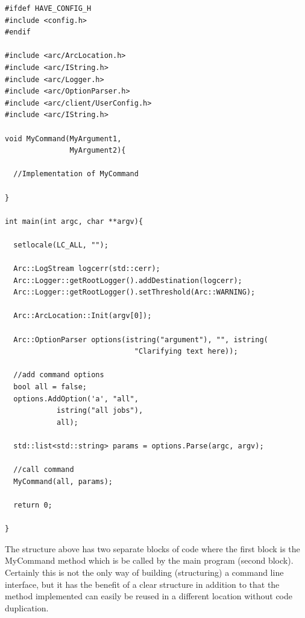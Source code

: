 \documentclass{book}
\begin{document}
\begin{shaded}
\begin{verbatim}
#ifdef HAVE_CONFIG_H
#include <config.h>
#endif

#include <arc/ArcLocation.h>
#include <arc/IString.h>
#include <arc/Logger.h>
#include <arc/OptionParser.h>
#include <arc/client/UserConfig.h>
#include <arc/IString.h>

void MyCommand(MyArgument1,
               MyArgument2){

  //Implementation of MyCommand

}

int main(int argc, char **argv){

  setlocale(LC_ALL, "");

  Arc::LogStream logcerr(std::cerr);
  Arc::Logger::getRootLogger().addDestination(logcerr);
  Arc::Logger::getRootLogger().setThreshold(Arc::WARNING);

  Arc::ArcLocation::Init(argv[0]);

  Arc::OptionParser options(istring("argument"), "", istring(
                              "Clarifying text here));

  //add command options
  bool all = false;
  options.AddOption('a', "all",
		    istring("all jobs"),
		    all);

  std::list<std::string> params = options.Parse(argc, argv);

  //call command
  MyCommand(all, params);

  return 0;

}
\end{verbatim}
\end{shaded}

The structure above has two separate blocks of code where the first block is the MyCommand method which is be 
called by the main program (second block). Certainly this is not the only way of building (structuring) a 
command line interface, but it has the benefit of a clear structure in addition to that the method implemented 
can easily be reused in a different location without code duplication.


\end{document}
